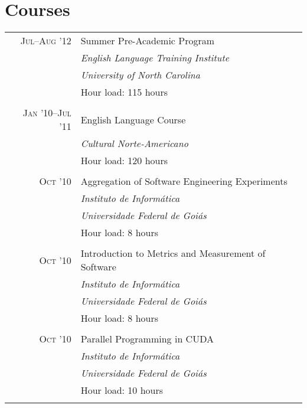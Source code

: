 \documentclass[a4paper,10pt]{article}
\begin{document}
\section{Courses}
\begin{tabular}{r|p{11cm}}

  \textsc{Jul--Aug '12} & Summer Pre-Academic Program\\ &
  \emph{English Language Training Institute}\\ &
  \emph{University of North Carolina}\\ &
  Hour load: 115 hours
  \\\multicolumn{2}{c}{} \\

  \textsc{Jan '10--Jul '11} & English Language Course\\ &
  \emph{Cultural Norte-Americano} \\ &
  Hour load: 120 hours
  \\\multicolumn{2}{c}{} \\

  \textsc{Oct '10} & Aggregation of Software Engineering Experiments\\ &
  \emph{Instituto de Informática} \\ &
  \emph{Universidade Federal de Goiás}\\ &
  Hour load: 8 hours
  \\\multicolumn{2}{c}{} \\

  \textsc{Oct '10} & Introduction to Metrics and Measurement of Software\\ &
  \emph{Instituto de Informática} \\ &
  \emph{Universidade Federal de Goiás}\\ &
  Hour load: 8 hours
  \\\multicolumn{2}{c}{} \\

  \textsc{Oct '10} & Parallel Programming in CUDA\\ &
  \emph{Instituto de Informática} \\ &
  \emph{Universidade Federal de Goiás}\\ &
  Hour load: 10 hours
  \\\multicolumn{2}{c}{} \\

\end{tabular}
\end{document}
